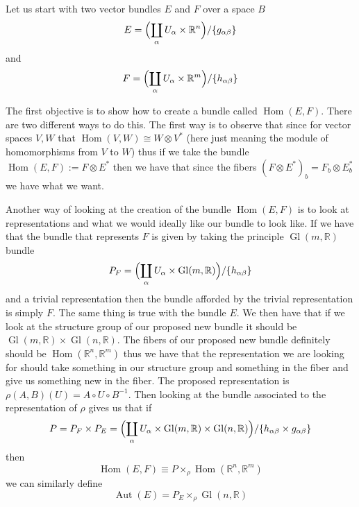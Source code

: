 \documentclass[12pt]{article}
\DeclareMathOperator{\Hom}{Hom}
\DeclareMathOperator{\Aut}{Aut}
\DeclareMathOperator{\Gl}{Gl}
\begin{document}
Let us start with two vector bundles $ E $ and $ F $ over a space $ B $
\begin{equation*}
E = \Bigl ( \coprod_{\alpha} U_{\alpha} \times \mathbb{R}^{n} \Bigr ) /\{g_{\alpha \beta} \}
\end{equation*}
and
\begin{equation*}
F = \Bigl ( \coprod_{\alpha} U_{\alpha} \times \mathbb{R}^{m} \Bigr) /\{h_{\alpha \beta} \}
\end{equation*}

The first objective is to show how to create a bundle called $ \Hom(E,F) $.  There are two different ways to do this.  The first way is to observe that since for vector spaces $ V, W $ that $ \Hom(V,W) \cong W \otimes V^{\ast} $ (here just meaning the module of homomorphisms from $ V $ to $ W $) thus if we take the bundle $ \Hom(E,F) := F \otimes E^{\ast} $ then we have that since the fibers $ (F\otimes E^{\ast})_{b} = F_{b} \otimes E^{\ast}_{b} $ we have what we want.

Another way of looking at the creation of the bundle $ \Hom(E,F) $ is to look at representations and what we would ideally like our bundle to look like.  If we have that the bundle that represents $ F $ is given by taking the principle $ \Gl (m,\mathbb{R}) $ bundle
\begin{equation*}
P_{F} = \Bigl( \coprod_{\alpha} U_{\alpha} \times \Gl(m, \mathbb{R}) \Bigl)/\{h_{\alpha \beta} \}
\end{equation*}
and a trivial representation then the bundle afforded by the trivial representation is simply $ F $.  The same thing is true with the bundle $ E $.  We then have that if we look at the structure group of our proposed new bundle it should be $ \Gl(m,\mathbb{R}) \times \Gl(n,\mathbb{R}) $.  The fibers of our proposed new bundle definitely should be $ \Hom(\mathbb{R}^{n},\mathbb{R}^{m}) $ thus we have that the representation we are looking for should take something in our structure group and something in the fiber and give us something new in the fiber.  The proposed representation is $ \rho(A,B)(U) = A \circ U \circ B^{-1} $.  Then looking at the bundle associated to the representation of $ \rho $ gives us that if 
\begin{equation*}
P = P_{F} \times P_{E} = \Bigl ( \coprod_{\alpha} U_{\alpha} \times \Gl(m, \mathbb{R}) \times \Gl(n,\mathbb{R}) \Bigr)/\{h_{\alpha \beta} \times g_{\alpha \beta} \} 
\end{equation*}
then 
\begin{equation*}
\Hom(E,F) \equiv P \times_{\rho} \Hom(\mathbb{R}^{n},\mathbb{R}^{m})
\end{equation*}
we can similarly define
\begin{equation*}
\Aut(E) = P_{E} \times_{\rho} \Gl(n,\mathbb{R})
\end{equation*}
\end{document}
